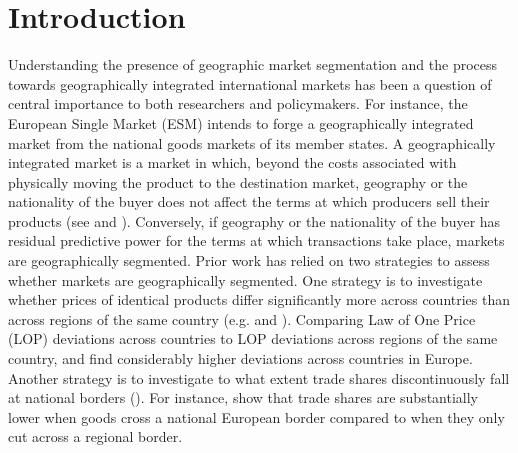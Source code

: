 \documentclass[11pt]{article}
\begin{document}
\newpage

\begin{spacing}{1}
\tableofcontents{}
\end{spacing}
\newpage 

\linenumbers
\section{Introduction}  
Understanding the presence of geographic market segmentation and the process towards geographically integrated international markets has been a question of central importance to both researchers and policymakers. For instance, the European Single Market (ESM) intends to forge a geographically integrated market from the national goods markets of its member states. A geographically integrated market is a market in which, beyond the costs associated with physically moving the product to the destination market, geography or the nationality of the buyer does not affect the terms at which producers sell their products (see \citet{Flam1992} and \citet{Goldberg1997}). Conversely, if geography or the nationality of the buyer has residual predictive power for the terms at which transactions take place, markets are geographically segmented. Prior work has relied on two strategies to assess whether markets are geographically segmented. One strategy is to investigate whether prices of identical products differ significantly more across countries than across regions of the same country (e.g. \citet{Engel1996} and \citet{Goldberg1997}). Comparing Law of One Price (LOP) deviations across countries to LOP deviations across regions of the same country, \citet{Beck2020} and \citet{Fontaine2020} find considerably higher deviations across countries in Europe. Another strategy is to investigate to what extent trade shares discontinuously fall at national borders (\citet{McCallum1995}). For instance, \citet{Santamaria2023} show that trade shares are substantially lower when goods cross a national European border compared to when they only cut across a regional border.

\newpage 

\begin{spacing}{1}
        
\end{spacing}
\end{document}
